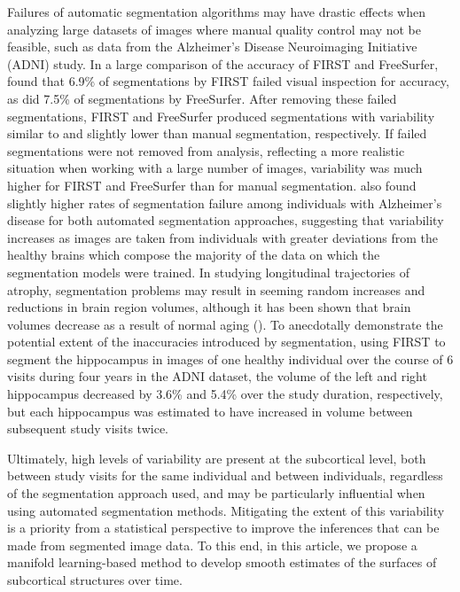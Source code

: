 \documentclass[11pt,reqno]{article}
\theoremstyle{definition}
\begin{document}
Failures of automatic segmentation algorithms may have drastic effects when analyzing large datasets of images where manual quality control may not be feasible, such as data from the Alzheimer's Disease Neuroimaging Initiative (ADNI) study. In a large comparison of the accuracy of FIRST and FreeSurfer, \cite{mulderHippocampalVolumeChange2014} found that 6.9\% of segmentations by FIRST failed visual inspection for accuracy, as did 7.5\% of segmentations by FreeSurfer. After removing these failed segmentations, FIRST and FreeSurfer produced segmentations with variability similar to and slightly lower than manual segmentation, respectively. If failed segmentations were not removed from analysis, reflecting a more realistic situation when working with a large number of images, variability was much higher for FIRST and FreeSurfer than for manual segmentation. \cite{mulderHippocampalVolumeChange2014} also found slightly higher rates of segmentation failure among individuals with Alzheimer's disease for both automated segmentation approaches, suggesting that variability increases as images are taken from individuals with greater deviations from the healthy brains which compose the majority of the data on which the segmentation models were trained. In studying longitudinal trajectories of atrophy, segmentation problems may result in seeming random increases and reductions in brain region volumes, although it has been shown that brain volumes decrease as a result of normal aging (\cite{scahill2003longitudinal}). To anecdotally demonstrate the potential extent of the inaccuracies introduced by segmentation, using FIRST to segment the hippocampus in images of one healthy individual over the course of 6 visits during four years in the ADNI dataset, the volume of the left and right hippocampus decreased by 3.6\% and 5.4\% over the study duration, respectively, but each hippocampus was estimated to have increased in volume between subsequent study visits twice.

Ultimately, high levels of variability are present at the subcortical level, both between study visits for the same individual and between individuals, regardless of the segmentation approach used, and may be particularly influential when using automated segmentation methods. Mitigating the extent of this variability is a priority from a statistical perspective to improve the inferences that can be made from segmented image data. To this end, in this article, we propose a manifold learning-based method to develop smooth estimates of the surfaces of subcortical structures over time.
\end{document}
